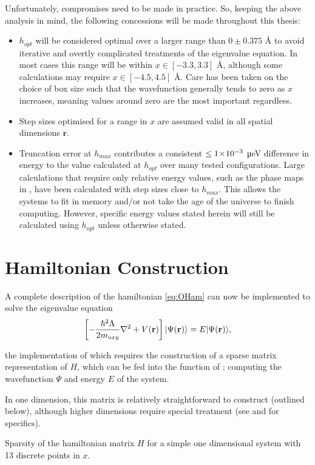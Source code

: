 Unfortunately, compromises need to be made in practice. So, keeping the above analysis in mind, the following concessions will be made throughout this thesis:
\begin{itemize}
  \item $h_{opt}$ will be considered optimal over a larger range than $0\pm0.375$ Å to avoid iterative and overtly complicated treatments of the eigenvalue equation.
      In most cases this range will be within $x \in [-3.3, 3.3]$ Å, although some calculations may require $x \in [-4.5, 4.5]$ Å.
      Care has been taken on the choice of box size such that the wavefunction generally tends to zero as $x$ increases, meaning values around zero are the most important regardless.
  \item Step sizes optimised for a range in $x$ are assumed valid in all spatial dimensions $\mathbf{r}$.
  \item Truncation error at $h_{max}$ contributes a consistent $\leq1\!\times\!10^{-3}$ μeV difference in energy to the value calculated at $h_{opt}$ over many tested configurations.
      Large calculations that require only relative energy values, such as the phase maps in , have been calculated with step sizes close to $h_{max}$.
      This allows the systems to fit in memory and/or not take the age of the universe to finish computing.
      However, specific energy values stated herein will still be calculated using $h_{opt}$ unless otherwise stated.
\end{itemize}


\section{Hamiltonian Construction}\label{sec:hammat}

A complete description of the hamiltonian \cref{eq:OHam} can now be implemented to solve the eigenvalue equation
\begin{equation}
\left[-\frac{\hbar^2\Lambda}{2m_{oxy}}\nabla^2+V(\mathbf{r})\right]\lvert\Psi(\mathbf{r})\rangle = E\lvert\Psi(\mathbf{r})\rangle,\label{eq:tisemat}
\end{equation}

the implementation of which requires the construction of a sparse matrix representation of $H$, which can be fed into the  function of ; computing the wavefunction $\Psi$ and energy $E$ of the system.

In one dimension, this matrix is relatively straightforward to construct (outlined below), although higher dimensions require special treatment (see  and  for specifics).
\begin{marginfigure}
\resizebox{\marginparwidth}{!}{}
\caption[Sparsity of the hamiltonian matrix $H$]{Sparsity of the hamiltonian matrix $H$ for a simple one dimensional system with 13 discrete points in $x$.}
\end{marginfigure}

